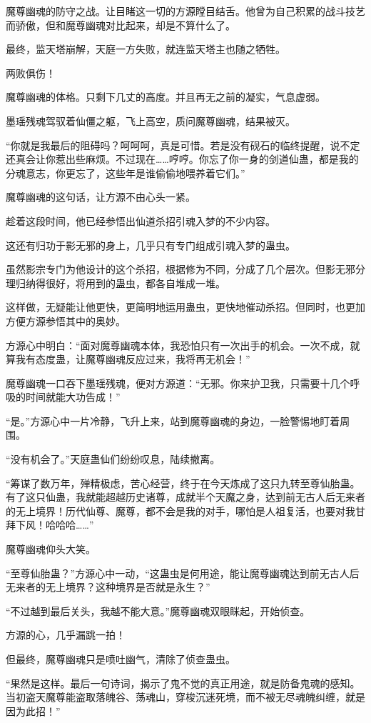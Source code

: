 \begin{this_body}
魔尊幽魂的防守之战。让目睹这一切的方源瞠目结舌。他曾为自己积累的战斗技艺而骄傲，但和魔尊幽魂对比起来，却是不算什么了。

最终，监天塔崩解，天庭一方失败，就连监天塔主也随之牺牲。

两败俱伤！

魔尊幽魂的体格。只剩下几丈的高度。并且再无之前的凝实，气息虚弱。

墨瑶残魂驾驭着仙僵之躯，飞上高空，质问魔尊幽魂，结果被灭。

“你就是我最后的阻碍吗？呵呵呵，真是可惜。若是没有砚石的临终提醒，说不定还真会让你惹出些麻烦。不过现在……哼哼。你忘了你一身的剑道仙蛊，都是我的分魂意志，你更忘了，这些年是谁偷偷地喂养着它们。”

魔尊幽魂的这句话，让方源不由心头一紧。

趁着这段时间，他已经参悟出仙道杀招引魂入梦的不少内容。

这还有归功于影无邪的身上，几乎只有专门组成引魂入梦的蛊虫。

虽然影宗专门为他设计的这个杀招，根据修为不同，分成了几个层次。但影无邪分理归纳得很好，将用到的蛊虫，都各自堆成一堆。

这样做，无疑能让他更快，更简明地运用蛊虫，更快地催动杀招。但同时，也更加方便方源参悟其中的奥妙。

方源心中明白：“面对魔尊幽魂本体，我恐怕只有一次出手的机会。一次不成，就算我有态度蛊，让魔尊幽魂反应过来，我将再无机会！”

魔尊幽魂一口吞下墨瑶残魂，便对方源道：“无邪。你来护卫我，只需要十几个呼吸的时间就能大功告成！”

“是。”方源心中一片冷静，飞升上来，站到魔尊幽魂的身边，一脸警惕地盯着周围。

“没有机会了。”天庭蛊仙们纷纷叹息，陆续撤离。

“筹谋了数万年，殚精极虑，苦心经营，终于在今天炼成了这只九转至尊仙胎蛊。有了这只仙蛊，我就能超越历史诸尊，成就半个天魔之身，达到前无古人后无来者的无上境界！历代仙尊、魔尊，都不会是我的对手，哪怕是人祖复活，也要对我甘拜下风！哈哈哈……”

魔尊幽魂仰头大笑。

“至尊仙胎蛊？”方源心中一动，“这蛊虫是何用途，能让魔尊幽魂达到前无古人后无来者的无上境界？这种境界是否就是永生？”

“不过越到最后关头，我越不能大意。”魔尊幽魂双眼眯起，开始侦查。

方源的心，几乎漏跳一拍！

但最终，魔尊幽魂只是喷吐幽气，清除了侦查蛊虫。

“果然是这样。最后一句诗词，揭示了鬼不觉的真正用途，就是防备鬼魂的感知。当初盗天魔尊能盗取落魄谷、荡魂山，穿梭沉迷死境，而不被无尽魂魄纠缠，就是因为此招！”


\end{this_body}
